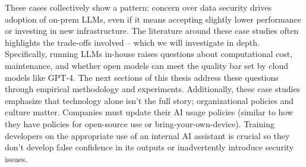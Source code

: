 These cases collectively show a pattern: concern over data security drives adoption of on-prem LLMs, even if it means accepting slightly lower performance or investing in new infrastructure. The literature around these case studies often highlights the trade-offs involved – which we will investigate in depth. Specifically, running LLMs in-house raises questions about computational cost, maintenance, and whether open models can meet the quality bar set by cloud models like GPT-4. The next sections of this thesis address these questions through empirical methodology and experiments.
Additionally, these case studies emphasize that technology alone isn’t the full story; organizational policies and culture matter. Companies must update their AI usage policies (similar to how they have policies for open-source use or bring-your-own-device). Training developers on the appropriate use of an internal AI assistant is crucial so they don’t develop false confidence in its outputs or inadvertently introduce security issues.

